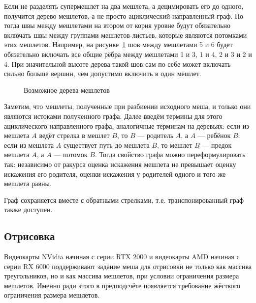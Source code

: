 Если не разделять супермешлет на два мешлета, а децимировать его до одного, получится дерево мешлетов, а не просто ациклический направленный граф.
Но тогда швы между мешлетами на втором от корня уровне будут обязательно включать швы между группами мешлетов-листьев, которые являются потомками этих мешлетов.
Например, на рисунке~\ref{fig:meshlet-tree-example} шов между мешлетами 5 и 6 будет обязательно включать все общие рёбра между мешлетами 1 и 3, 1 и 4, 2 и 3 и 2 и 4.
При значительной высоте дерева такой шов сам по себе может включать сильно больше вершин, чем допустимо включить в один мешлет.
\begin{figure}
    \centering
    \caption{Возможное дерева мешлетов}
    \label{fig:meshlet-tree-example}
\end{figure}

Заметим, что мешлеты, полученные при разбиении исходного меша, и только они являются истоками полученного графа.
Далее введём термины для этого ациклического направленного графа, аналогичные терминам на деревьях: если из мешлета $A$ ведёт стрелка в мешлет $B$, то $B$ --- родитель $A$, а $A$ --- ребёнок $B$; если из мешлета $A$ существует путь до мешлета $B$, то мешлет $B$ --- предок мешлета $A$, а $A$ --- потомок $B$.
Тогда свойство графа можно переформулировать так: независимо от ракурса оценка искажения мешлета не превышает оценку искажения его родителя, оценки искажения у родителей одного и того же мешлета равны.

Граф сохраняется вместе с обратными стрелками, т.е. транспонированный граф также доступен.

\subsection*{Отрисовка}
Видеокарты NVidia начиная с серии RTX 2000 и видеокарты AMD начиная с серии RX 6000 поддерживают задание меша для отрисовки не только как массива треугольников, но и как массива мешлетов, при условии ограничения размера мешлетов.
Именно ради этого в предподсчёте появляется требование жёсткого ограничения размера мешлетов.

